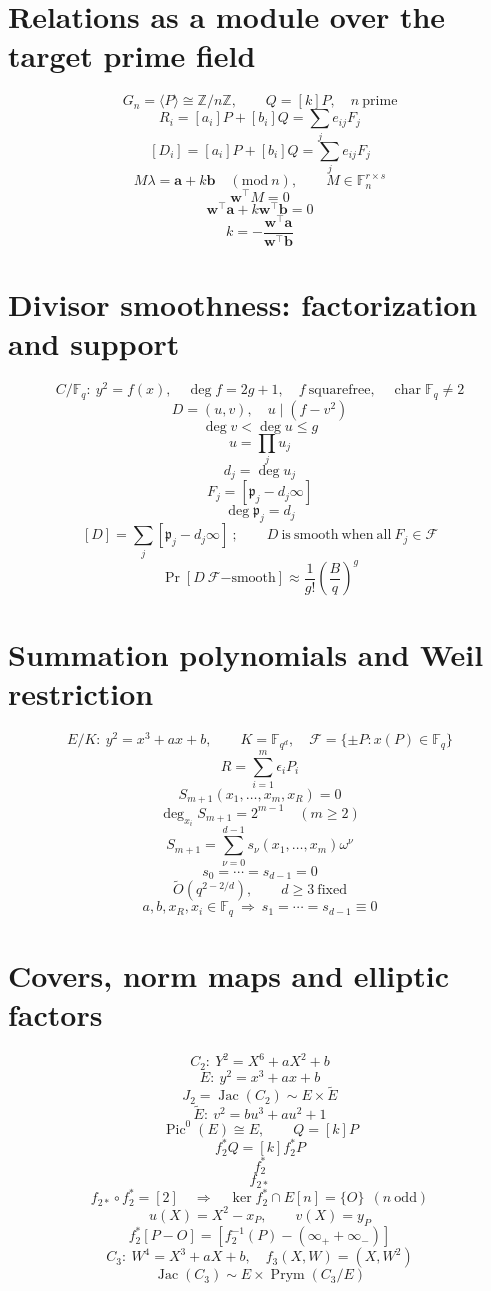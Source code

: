 \documentclass{article}
\begin{document}
\section*{Relations as a module over the target prime field}
\[
G_n=\langle P\rangle\cong\mathbb{Z}/n\mathbb{Z},\qquad Q=[k]P,\quad n\ \mathrm{prime}
\]
\[
R_i=[a_i]P+[b_i]Q=\sum_j e_{ij}F_j
\]
\[
[D_i]=[a_i]P+[b_i]Q=\sum_j e_{ij}F_j
\]
\[
M\lambda=\mathbf{a}+k\mathbf{b}\quad (\mathrm{mod}\ n),\qquad M\in\mathbb{F}_n^{r\times s}
\]
\[
\mathbf{w}^{\top}M=0
\]
\[
\mathbf{w}^{\top}\mathbf{a}+k\mathbf{w}^{\top}\mathbf{b}=0
\]
\[
k=-\frac{\mathbf{w}^{\top}\mathbf{a}}{\mathbf{w}^{\top}\mathbf{b}}
\]
\section*{Divisor smoothness: factorization and support}
\[
C/\mathbb{F}_q:\ y^2=f(x),\quad \deg f=2g+1,\quad f\ \mathrm{squarefree},\quad\operatorname{char}\mathbb{F}_q\ne2
\]
\[
D=(u,v),\quad u\mid(f-v^2)
\]
\[
\deg v<\deg u\leq g
\]
\[
u=\prod_j u_j
\]
\[
d_j=\deg u_j
\]
\[
F_j=[\mathfrak{p}_j-d_j\infty]
\]
\[
\deg\mathfrak{p}_j=d_j
\]
\[
[D]=\sum_j[\mathfrak{p}_j-d_j\infty]\ ;\qquad D\ \mathrm{is\ smooth\ when\ all}\ F_j\in\mathcal{F}
\]
\[
\Pr[D\ \mathcal{F}\mathrm{-smooth}]\approx\frac{1}{g!}\left(\frac{B}{q}\right)^g
\]
\section*{Summation polynomials and Weil restriction}
\[
E/K:\ y^2=x^3+ax+b,\qquad K=\mathbb{F}_{q^d},\quad \mathcal{F}=\{\pm P:x(P)\in\mathbb{F}_q\}
\]
\[
R=\sum_{i=1}^{m}\epsilon_iP_i
\]
\[
S_{m+1}(x_1,\ldots,x_m,x_R)=0
\]
\[
\deg_{x_i}S_{m+1}=2^{m-1}\quad(m\geq2)
\]
\[
S_{m+1}=\sum_{\nu=0}^{d-1}s_\nu(x_1,\ldots,x_m)\omega^\nu
\]
\[
s_0=\cdots=s_{d-1}=0
\]
\[
\widetilde{O}(q^{2-2/d}),\qquad d\geq3\ \mathrm{fixed}
\]
\[
a,b,x_R,x_i\in\mathbb{F}_q\ \Longrightarrow\ s_1=\cdots=s_{d-1}\equiv0
\]
\section*{Covers, norm maps and elliptic factors}
\[
C_2:\ Y^2=X^6+aX^2+b
\]
\[
E:\ y^2=x^3+ax+b
\]
\[
J_2=\operatorname{Jac}(C_2)\sim E\times\widetilde{E}
\]
\[
\widetilde{E}:\ v^2=bu^3+au^2+1
\]
\[
\operatorname{Pic}^0(E)\cong E,\qquad Q=[k]P
\]
\[
f_2^*Q=[k]f_2^*P
\]
\[
f_2^*
\]
\[
f_{2*}
\]
\[
f_{2*}\circ f_2^*=[2]\quad\Longrightarrow\quad\ker f_2^*\cap E[n]=\{O\}\ \ (n\ \mathrm{odd})
\]
\[
u(X)=X^2-x_P,\qquad v(X)=y_P
\]
\[
f_2^*[P-O]=[f_2^{-1}(P)-(\infty_++\infty_-)]
\]
\[
C_3:\ W^4=X^3+aX+b,\quad f_3(X,W)=(X,W^2)
\]
\[
\operatorname{Jac}(C_3)\sim E\times\operatorname{Prym}(C_3/E)
\]
\end{document}
